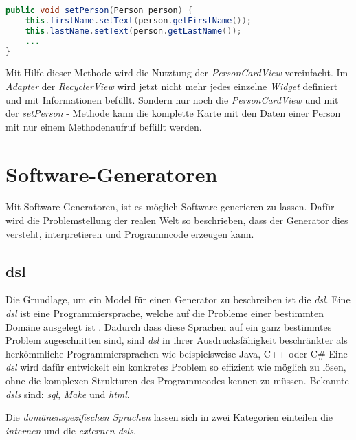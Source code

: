 \begin{lstlisting}[label=lst:setPerson,
language=java,
firstnumber=1,
caption=\textit{setPerson} - Methode aus der \textit{PersonCardView}.]				  
public void setPerson(Person person) {
	this.firstName.setText(person.getFirstName());
	this.lastName.setText(person.getLastName());	
	...
}
\end{lstlisting}

Mit Hilfe dieser Methode wird die Nutztung der \textit{PersonCardView} vereinfacht. Im \textit{Adapter} der \textit{RecyclerView} wird jetzt nicht mehr jedes einzelne \textit{Widget} definiert und mit Informationen befüllt. Sondern nur noch die \textit{PersonCardView} und mit der \textit{setPerson} - Methode kann die komplette Karte mit den Daten einer Person mit nur einem Methodenaufruf befüllt werden.

\section{Software-Generatoren}\label{sec:generators}

Mit Software-Generatoren, ist es möglich Software generieren zu lassen. Dafür wird die Problemstellung der realen Welt so beschrieben, dass der Generator dies versteht, interpretieren und Programmcode erzeugen kann.

\subsection{\acf{dsl}}\label{sec:dsl}
Die Grundlage, um ein Model für einen Generator zu beschreiben ist die \textit{\acl{dsl}}.
Eine \textit{\acs{dsl}} ist eine Programmiersprache, welche auf die Probleme einer bestimmten Domäne ausgelegt ist \cite{dslHudak}. Dadurch dass diese Sprachen auf ein ganz bestimmtes Problem zugeschnitten sind, sind \textit{\acl{dsl}} in ihrer Ausdrucksfähigkeit beschränkter als herkömmliche Programmiersprachen wie beispielsweise Java, C++ oder C\# Eine \textit{\acl{dsl}} wird dafür entwickelt ein konkretes Problem so effizient wie möglich zu lösen, ohne die komplexen Strukturen des Programmcodes kennen zu müssen.
Bekannte \textit{\aclp{dsl}} sind: \textit{\ac{sql}}, \textit{Make} und \textit{\acf{html}}.

Die \textit{domänenspezifischen Sprachen} lassen sich in zwei Kategorien einteilen die \textit{internen} und die \textit{externen \acsp{dsl}}.

